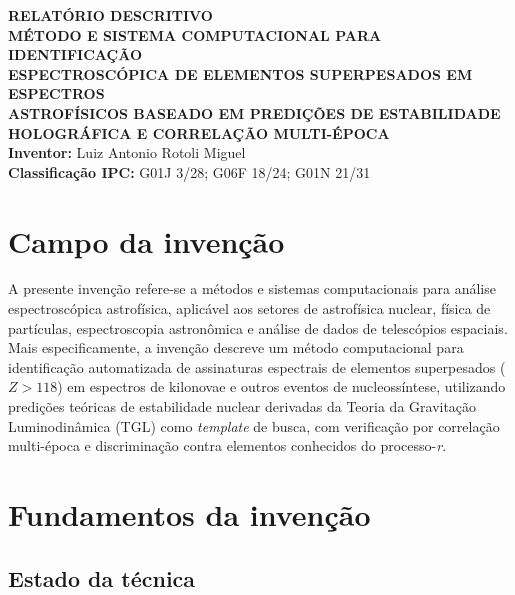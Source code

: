 \documentclass[12pt,a4paper]{article}
\begin{document}
\begin{center}
{\Large\bfseries RELATÓRIO DESCRITIVO}\\[0.8cm]
{\large\bfseries MÉTODO E SISTEMA COMPUTACIONAL PARA IDENTIFICAÇÃO\\
ESPECTROSCÓPICA DE ELEMENTOS SUPERPESADOS EM ESPECTROS\\
ASTROFÍSICOS BASEADO EM PREDIÇÕES DE ESTABILIDADE\\
HOLOGRÁFICA E CORRELAÇÃO MULTI-ÉPOCA}\\[0.8cm]
\textbf{Inventor:} Luiz Antonio Rotoli Miguel\\[0.3cm]
\textbf{Classificação IPC:} G01J 3/28; G06F 18/24; G01N 21/31
\end{center}

\vspace{1cm}

\section{Campo da invenção}

A presente invenção refere-se a métodos e sistemas computacionais
para análise espectroscópica astrofísica, aplicável aos setores de
astrofísica nuclear, física de partículas, espectroscopia
astronômica e análise de dados de telescópios espaciais. Mais
especificamente, a invenção descreve um método computacional para
identificação automatizada de assinaturas espectrais de elementos
superpesados ($Z > 118$) em espectros de kilonovae e outros eventos
de nucleossíntese, utilizando predições teóricas de estabilidade
nuclear derivadas da Teoria da Gravitação Luminodinâmica (TGL)
como \textit{template} de busca, com verificação por correlação
multi-época e discriminação contra elementos conhecidos do
processo-\textit{r}.

\newpage
\section{Fundamentos da invenção}

\subsection{Estado da técnica}
\end{document}
